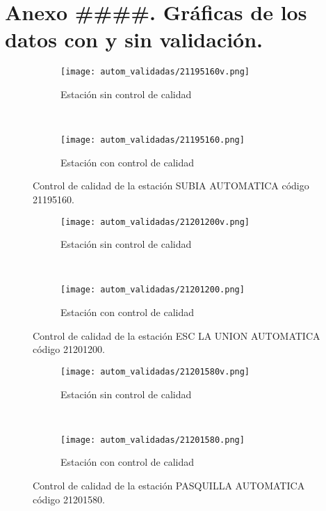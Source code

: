 \appendix
\clearpage
\addappheadtotoc
\appendixpage

\chapter{Anexo ####. Gráficas de los datos con y sin validación.}
\begin{figure}[H]
\begin{subfigure}[b]{0.5\textwidth}
\begin{center}
\texttt{[image: autom\_validadas/21195160v.png]}
\caption{Estación sin control de calidad}
        \end{center}
\end{subfigure}
~
\begin{subfigure}[b]{0.5\textwidth}
\begin{center}
\texttt{[image: autom\_validadas/21195160.png]}
\caption{Estación con control de calidad}
\end{center}    
\end{subfigure}
\caption{Control de calidad de la estación SUBIA AUTOMATICA código 21195160.}
\end{figure}    
  
\begin{figure}[H]
\begin{subfigure}[b]{0.5\textwidth}
\begin{center}
\texttt{[image: autom\_validadas/21201200v.png]}
\caption{Estación sin control de calidad}
        \end{center}
\end{subfigure}
~
\begin{subfigure}[b]{0.5\textwidth}
\begin{center}
\texttt{[image: autom\_validadas/21201200.png]}
\caption{Estación con control de calidad}
\end{center}    
\end{subfigure}
\caption{Control de calidad de la estación ESC LA UNION AUTOMATICA código 21201200.}
\end{figure}    
  
\begin{figure}[H]
\begin{subfigure}[b]{0.5\textwidth}
\begin{center}
\texttt{[image: autom\_validadas/21201580v.png]}
\caption{Estación sin control de calidad}
        \end{center}
\end{subfigure}
~
\begin{subfigure}[b]{0.5\textwidth}
\begin{center}
\texttt{[image: autom\_validadas/21201580.png]}
\caption{Estación con control de calidad}
\end{center}    
\end{subfigure}
\caption{Control de calidad de la estación PASQUILLA AUTOMATICA código 21201580.}
\end{figure}    
  
